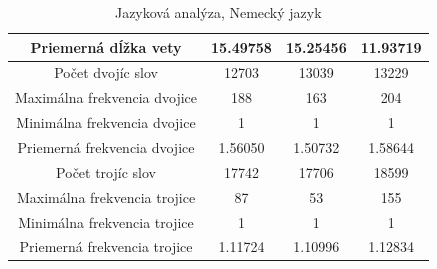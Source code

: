 \begin{table}[]
\begin{tabular}{|c|c|c|c|}
Priemerná dĺžka vety & 15.49758 & 15.25456 & 11.93719 \\ \hline
Počet dvojíc slov & 12703 & 13039 & 13229 \\ \hline
Maximálna frekvencia dvojice & 188 & 163 & 204 \\ \hline
Minimálna frekvencia dvojice & 1 & 1 & 1 \\ \hline
Priemerná frekvencia dvojice & 1.56050 & 1.50732 & 1.58644 \\ \hline
Počet trojíc slov & 17742 & 17706 & 18599 \\ \hline
Maximálna frekvencia trojice & 87 & 53 & 155 \\ \hline
Minimálna frekvencia trojice & 1 & 1 & 1 \\ \hline
Priemerná frekvencia trojice & 1.11724 & 1.10996 & 1.12834 \\ \hline
\end{tabular}
\caption{Jazyková analýza, Nemecký jazyk}
\end{table}